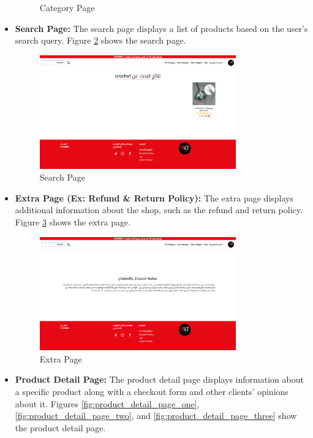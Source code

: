 \begin{itemize}
\begin{figure}[H]
        \caption{Category Page}
        \label{fig:category_page}
    \end{figure}
    \item \textbf{Search Page:} The search page displays a list of products based on the user's search query. Figure \ref{fig:search_page} shows the search page.
    \begin{figure}[H]
        \centering
        \includegraphics[width=0.8\textwidth]{images/searchPage.png}
        \caption{Search Page}
        \label{fig:search_page}
    \end{figure}
    \item \textbf{Extra Page (Ex: Refund \& Return Policy):} The extra page displays additional information about the shop, such as the refund and return policy. Figure \ref{fig:extra_page} shows the extra page.
    \begin{figure}[H]
        \centering
        \includegraphics[width=0.8\textwidth]{images/extra_page.png}
        \caption{Extra Page}
        \label{fig:extra_page}
    \end{figure}
    \item \textbf{Product Detail Page:} The product detail page displays information about a specific product along with a checkout form and other clients' opinions about it. Figures \ref{fig:product_detail_page_one}, \ref{fig:product_detail_page_two}, and \ref{fig:product_detail_page_three} show the product detail page.

\end{itemize}
